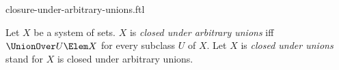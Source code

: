 \documentclass{stex}
\begin{document}
\begin{smodule}{closure-under-arbitrary-unions.ftl}



\begin{definition*}[forthel,for={closed under arbitrary unions,closed under unions}]
  Let $X$ be a system of sets.
  $X$ is \emph{closed under arbitrary unions} iff $\UnionOver U \Elem X$ for every  subclass $U$ of $X$.
  Let $X$ is \emph{closed under unions} stand for $X$ is closed under arbitrary unions.
\end{definition*}

\end{smodule}
\end{document}
